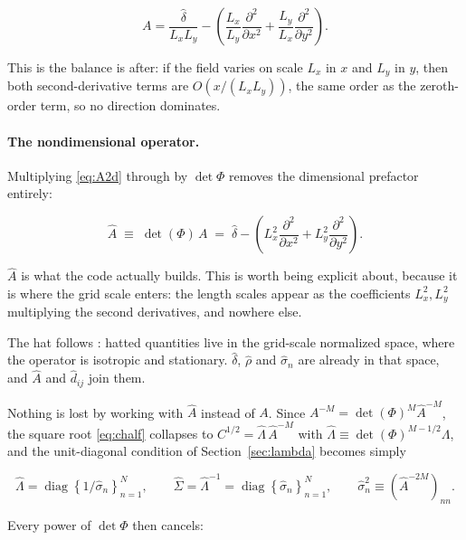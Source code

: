 \documentclass[11pt]{article}
\newcommand{\dhat}{\hat{\delta}}
\newcommand{\rhohat}{\hat{\rho}}
\newcommand{\shat}{\hat{\sigma}}
\newcommand{\Ahat}{\hat{A}}
\begin{document}
\begin{equation}
\label{eq:A2d}
A = \frac{\dhat}{L_x L_y}
  - \left(\frac{L_x}{L_y}\frac{\partial^2}{\partial x^2}
        + \frac{L_y}{L_x}\frac{\partial^2}{\partial y^2}\right).
\end{equation}

This is the balance \citet{smith2022} is after: if the field varies on scale $L_x$ in
$x$ and $L_y$ in $y$, then both second-derivative terms are $O(x/(L_x L_y))$, the same
order as the zeroth-order term, so no direction dominates.

\paragraph{The nondimensional operator.} Multiplying \eqref{eq:A2d} through by
$\det\Phi$ removes the dimensional prefactor entirely:

\begin{equation}
\label{eq:Ahat}
\Ahat \;\equiv\; \det(\Phi)\,A
  \;=\; \dhat - \left(L_x^2 \frac{\partial^2}{\partial x^2}
                    + L_y^2 \frac{\partial^2}{\partial y^2}\right).
\end{equation}

$\Ahat$ is what the code actually builds. This is worth being explicit about,
because it is where the grid scale enters: the length scales appear as the coefficients
$L_x^2, L_y^2$ multiplying the second derivatives, and nowhere else.

The hat follows \citet{smith2022}: hatted quantities live in the grid-scale normalized
space, where the operator is isotropic and stationary. $\dhat$, $\rhohat$ and $\shat_n$
are already in that space, and $\Ahat$ and $\hat{d}_{ij}$ join them.

Nothing is lost by working with $\Ahat$ instead of $A$. Since
$A^{-M} = \det(\Phi)^{M}\Ahat^{-M}$, the square root \eqref{eq:chalf} collapses to
$C^{1/2} = \hat{\Lambda}\,\Ahat^{-M}$ with
$\hat{\Lambda} \equiv \det(\Phi)^{M-1/2}\Lambda$, and the unit-diagonal condition of
Section~\ref{sec:lambda} becomes simply

\begin{equation}
\label{eq:lambdahat}
\hat{\Lambda} = \operatorname{diag}\left\{1/\shat_n\right\}_{n=1}^{N},
\qquad
\hat{\Sigma} = \hat{\Lambda}^{-1} = \operatorname{diag}\left\{\shat_n\right\}_{n=1}^{N},
\qquad
\shat^2_n \equiv \left(\Ahat^{-2M}\right)_{nn}.
\end{equation}

Every power of $\det\Phi$ then cancels:
\end{document}
